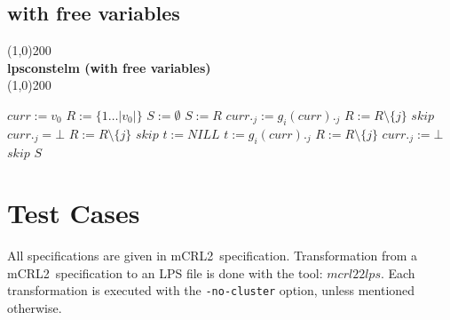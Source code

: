 \index{}\documentclass[a4paper,10pt]{article}
\theoremstyle{plain}
\theoremstyle{definition}
\newcommand{\mcrl}{mCRL2}
\begin{document}
\subsection{with free variables}
\line(1,0){200}\\
\textbf{lpsconstelm (with free variables)}\\
\line(1,0){200}
\begin{algorithmic}[1]
\STATE $curr := v_0$
\STATE $R := \lbrace 1 \ldots \vert v_0 \vert \rbrace $
\STATE $S := \emptyset $
    \STATE $S := R$
              \STATE $ curr._j := g_i(curr)._j $
                \STATE $R:= R \setminus \lbrace j \rbrace $
	      \ENDIF
               \STATE $ skip $
            \ENDIF
              \STATE $curr._j = \bot$
              \STATE $R := R \setminus \lbrace j \rbrace$
              \STATE $skip$
            \ENDIF
          \ENDIF
        \ENDFOR
    \ENDFOR
  \ENDWHILE \newline
    \STATE $t:= NILL$
        \STATE $ t := g_i(curr)._j $
        \STATE $ R := R \setminus \lbrace j \rbrace$
        \STATE $ curr._j := \bot $
        \STATE $skip$
      \ENDIF
    \ENDFOR
  \ENDFOR
\ENDWHILE
\RETURN $S$
\end{algorithmic}
\newpage

\section{Test Cases}
All specifications are given in \mcrl\ specification.
Transformation from a \mcrl\ specification to an LPS file is done with the tool:
$mcrl22lps$. Each transformation is executed with the \verb"-no-cluster" option, unless
mentioned otherwise.
\end{document}
